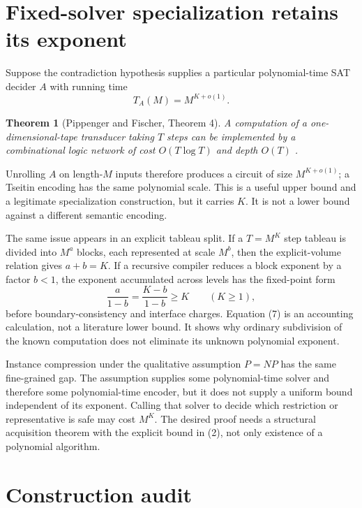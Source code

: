 \documentclass[11pt]{article}
\newtheorem{theorem}{Theorem}
\begin{document}
\section{Fixed-solver specialization retains its exponent}

Suppose the contradiction hypothesis supplies a particular polynomial-time
SAT decider $A$ with running time
\[
 T_A(M)=M^{K+o(1)}.
\]

\begin{theorem}[Pippenger and Fischer, Theorem 4]
A computation of a one-dimensional-tape transducer taking $T$ steps can be
implemented by a combinational logic network of cost $O(T\log T)$ and depth
$O(T)$ \cite{pippengerfischer1979}.
\end{theorem}

Unrolling $A$ on length-$M$ inputs therefore produces a circuit of size
$M^{K+o(1)}$; a Tseitin encoding has the same polynomial scale.  This is a
useful upper bound and a legitimate specialization construction, but it
carries $K$.  It is not a lower bound against a different semantic
encoding.

The same issue appears in an explicit tableau split.  If a $T=M^K$ step
tableau is divided into $M^a$ blocks, each represented at scale $M^b$, then
the explicit-volume relation gives $a+b=K$.  If a recursive compiler reduces
a block exponent by a factor $b<1$, the exponent accumulated across levels
has the fixed-point form
\[
 \frac{a}{1-b}=\frac{K-b}{1-b}\ge K\qquad(K\ge1),
\]
before boundary-consistency and interface charges.  Equation (7) is an
accounting calculation, not a literature lower bound.  It shows why
ordinary subdivision of the known computation does not eliminate its
unknown polynomial exponent.

Instance compression under the qualitative assumption $P=NP$ has the same
fine-grained gap.  The assumption supplies some polynomial-time solver and
therefore some polynomial-time encoder, but it does not supply a uniform
bound independent of its exponent.  Calling that solver to decide which
restriction or representative is safe may cost $M^K$.  The desired proof
needs a structural acquisition theorem with the explicit bound in (2), not
only existence of a polynomial algorithm.

\section{Construction audit}
\end{document}

